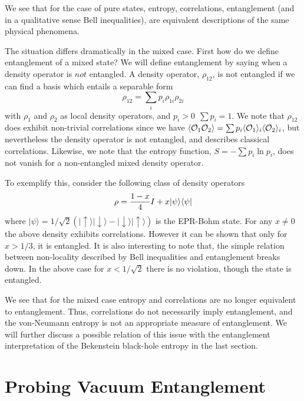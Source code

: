 \documentclass[12pt]{article}
\newcommand{\beq}{\begin{equation}}
\newcommand{\eeq}{\end{equation}}
\def \la {\langle}
\def \ra {\rangle}
\def \up {\uparrow}
\def \down {\downarrow}
\begin{document}
We see that for the case of pure states,  entropy, correlations,
entanglement
(and in a qualitative sense Bell inequalities), are equivalent
descriptions of the same physical phenomena.

The situation differs dramatically in the mixed case.
First how do we define entanglement of a mixed state?
We will define entanglement by saying when a density operator is
$not$
entangled.
A density operator, $\rho_{12}$, is not entangled if
we can find a basis which entails a separable form
\cite{wernerdensity}
\beq
\rho_{12} = \sum_i p_i \rho_{1i}\rho_{2i}
\eeq
with $\rho_1$ and $\rho_2$ as local density operators, and
$p_i>0\ \ \sum
p_i=1$.
We note that $\rho_{12}$ does exhibit non-trivial correlations
since we have
$\la {\cal O}_1{\cal O}_2 \ra = \sum p_i \la {\cal O}_1\ra_i\la
{\cal O}_2
\ra_i$,
but nevertheless the density operator is not entangled, and
describes classical correlations.
Likewise, we note that the entropy function, $S=-\sum p_i \ln
p_i$,
does not vanish for a non-entangled mixed density operator.


To exemplify this, consider the following class of density
operators
\cite{wernerdensity}
\beq
\rho = {1-x\over 4} I + x |{\psi}\ra\la {\psi}|
\eeq
where  $|{\psi}\ra=1/\sqrt2(|\up\ra|\down\ra-|\down\ra|\up\ra)$
is the
EPR-Bohm state.
For any $x\neq0$ the above density exhibits correlations.
However it can be shown that only for $x>1/3$, it is entangled.
It is also interesting to note that, the simple relation between
non-locality described by Bell inequalities and entanglement
breaks down.
In the above case for $x<1/\sqrt2$ there is no violation, though
the state
is entangled.

We see that for the mixed case
entropy and correlations are no longer equivalent to entanglement.
Thus, correlations do not necessarily imply entanglement,
and the von-Neumann entropy is not an appropriate measure of
entanglement.
We will further discuss a possible relation of this issue
with the entanglement interpretation \cite{sorkin} of the
Bekenstein
black-hole entropy \cite{bekenstein} in the last section.




\section{\bf Probing Vacuum Entanglement }
\end{document}
